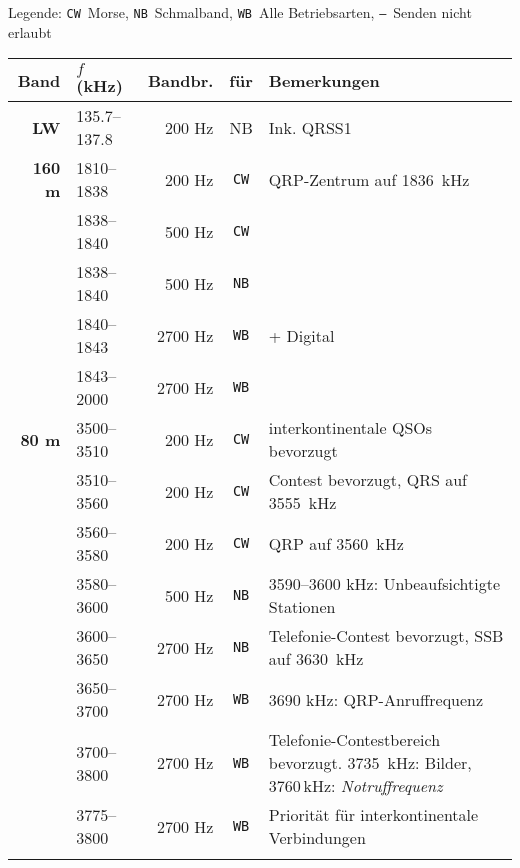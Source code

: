 {
\newcommand{\lCW}{\texttt{CW}}
\newcommand{\lNB}{\texttt{NB}}
\newcommand{\lWB}{\texttt{WB}}
\newcommand{\lXX}{\texttt{---}}

Legende: \lCW\ Morse, \lNB\ Schmalband, \lWB\ Alle Betriebsarten, \lXX\ Senden nicht erlaubt

\setlength{\belowrulesep}{1pt}
\setlength{\aboverulesep}{1pt}
\newcommand{\notruf}[1]{\textcolor{nr}{ #1\,kHz: \textit{Notruffrequenz}}}

\begin{longtabu} to 
\rowfont \bfseries Band & $f$ (kHz) & Bandbr. & für & Bemerkungen \\
\toprule
\endhead

\bfseries LW & 135.7–137.8 & 200 Hz & NB & Ink. QRSS1 \\  \midrule

\bfseries 160 m & 1810–1838 & 200 Hz & \lCW & QRP-Zentrum auf 1836 kHz \\  \midrule
 & 1838–1840 & 500 Hz  & \lCW \\ \midrule
 & 1838–1840 & 500 Hz  & \lNB \\ \midrule
 & 1840–1843 & 2700 Hz & \lWB & + Digital \\ \midrule
 & 1843–2000 & 2700 Hz & \lWB \\  \midrule

\bfseries 80 m & 3500–3510 & 200 Hz & \lCW & interkontinentale QSOs bevorzugt \\  \midrule
 & 3510–3560 & 200 Hz  & \lCW & Contest bevorzugt, QRS auf 3555 kHz \\ \midrule
 & 3560–3580 & 200 Hz  & \lCW & QRP auf 3560 kHz \\ \midrule
 & 3580–3600 & 500 Hz  & \lNB & 3590–3600 kHz: Unbeaufsichtigte Stationen\\ \midrule
 & 3600–3650 & 2700 Hz & \lNB & Telefonie-Contest bevorzugt, SSB auf 3630 kHz\\ \midrule
 & 3650–3700 & 2700 Hz & \lWB & 3690 kHz: QRP-Anruffrequenz\\ \midrule
 & 3700–3800 & 2700 Hz & \lWB & Telefonie-Contest­bereich bevorzugt. 3735 kHz: Bilder, \notruf{3760}\\ \midrule
 & 3775–3800 & 2700 Hz & \lWB & Priorität für interkontinentale Verbindungen \\  \midrule


\end{longtabu}}
